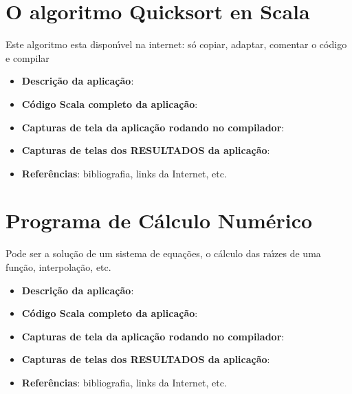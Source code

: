     \section{O algoritmo Quicksort en Scala}
    Este algoritmo esta dispon\'{\i}vel na internet: s\'{o} copiar, adaptar, comentar o c\'{o}digo e compilar
    \begin{itemize}
      \item \textbf{Descri\c{c}\~{a}o da aplica\c{c}\~{a}o}:
      \item \textbf{C\'{o}digo Scala completo da aplica\c{c}\~{a}o}:
      \item \textbf{Capturas de tela da aplica\c{c}\~{a}o rodando no compilador}:
      \item \textbf{Capturas de telas dos RESULTADOS da aplica\c{c}\~{a}o}:
      \item \textbf{Refer\^{e}ncias}: bibliografia, links da Internet, etc.
    \end{itemize}


    \section{Programa de C\'{a}lculo Num\'{e}rico}
    Pode ser a solu\c{c}\~{a}o de um sistema de equa\c{c}\~{o}es, o c\'{a}lculo das ra\'{\i}zes de uma fun\c{c}\~{a}o,  interpola\c{c}\~{a}o, etc.
    \begin{itemize}
      \item \textbf{Descri\c{c}\~{a}o da aplica\c{c}\~{a}o}:
      \item \textbf{C\'{o}digo Scala completo da aplica\c{c}\~{a}o}:
      \item \textbf{Capturas de tela da aplica\c{c}\~{a}o rodando no compilador}:
      \item \textbf{Capturas de telas dos RESULTADOS da aplica\c{c}\~{a}o}:
      \item \textbf{Refer\^{e}ncias}: bibliografia, links da Internet, etc.
    \end{itemize}

